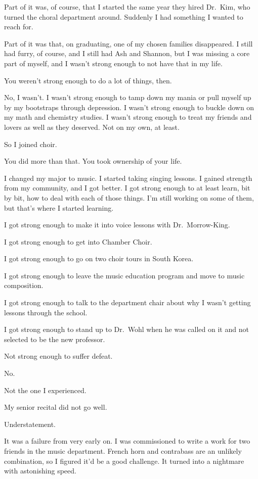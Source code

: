 \begin{leftcolumn}
Part of it was, of course, that I started the same year they hired Dr.~Kim, who turned the choral department around. Suddenly I had something I wanted to reach for.

Part of it was that, on graduating, one of my chosen families disappeared. I still had furry, of course, and I still had Ash and Shannon, but I was missing a core part of myself, and I wasn't strong enough to not have that in my life.

\begin{ally}
You weren't strong enough to do a lot of things, then.
\end{ally}
No, I wasn't. I wasn't strong enough to tamp down my mania or pull myself up by my bootstraps through depression. I wasn't strong enough to buckle down on my math and chemistry studies. I wasn't strong enough to treat my friends and lovers as well as they deserved. Not on my own, at least.

So I joined choir.

\begin{ally}
You did more than that. You took ownership of your life.
\end{ally}
I changed my major to music. I started taking singing lessons. I gained strength from my community, and I got better. I got strong enough to at least learn, bit by bit, how to deal with each of those things. I'm still working on some of them, but that's where I started learning.

I got strong enough to make it into voice lessons with Dr.~Morrow-King.

I got strong enough to get into Chamber Choir.

I got strong enough to go on two choir tours in South Korea.

I got strong enough to leave the music education program and move to music composition.

I got strong enough to talk to the department chair about why I wasn't getting lessons through the school.

I got strong enough to stand up to Dr.~Wohl when he was called on it and not selected to be the new professor.

\begin{ally}
Not strong enough to suffer defeat.
\end{ally}
No.

Not the one I experienced.
\newpage

My senior recital did not go well.

\begin{ally}
Understatement.
\end{ally}
It was a failure from very early on. I was commissioned to write a work for two friends in the music department. French horn and contrabass are an unlikely combination, so I figured it'd be a good challenge. It turned into a nightmare with astonishing speed.


\end{leftcolumn}
